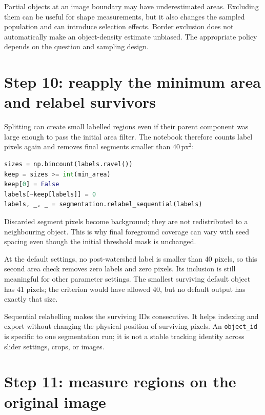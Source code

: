 \documentclass[11pt,letterpaper]{article}
\newcommand{\field}[1]{\nolinkurl{#1}}
\newcommand{\pxsq}{\ensuremath{\mathrm{px}^{2}}}
\begin{document}
Partial objects at an image boundary may have underestimated areas. Excluding them can be useful for shape measurements, but it also changes the sampled population and can introduce selection effects. Border exclusion does not automatically make an object-density estimate unbiased. The appropriate policy depends on the question and sampling design.

\section{Step 10: reapply the minimum area and relabel survivors}
\label{sec:postfilter}

Splitting can create small labelled regions even if their parent component was large enough to pass the initial area filter. The notebook therefore counts label pixels again and removes final segments smaller than 40\,\pxsq:
\begin{lstlisting}[language=Python]
sizes = np.bincount(labels.ravel())
keep = sizes >= int(min_area)
keep[0] = False
labels[~keep[labels]] = 0
labels, _, _ = segmentation.relabel_sequential(labels)
\end{lstlisting}
Discarded segment pixels become background; they are not redistributed to a neighbouring object. This is why final foreground coverage can vary with seed spacing even though the initial threshold mask is unchanged.

At the default settings, no post-watershed label is smaller than 40 pixels, so this second area check removes zero labels and zero pixels. Its inclusion is still meaningful for other parameter settings. The smallest surviving default object has 41 pixels; the criterion would have allowed 40, but no default output has exactly that size.

Sequential relabelling makes the surviving IDs consecutive. It helps indexing and export without changing the physical position of surviving pixels. An \field{object_id} is specific to one segmentation run; it is not a stable tracking identity across slider settings, crops, or images.

\section{Step 11: measure regions on the original image}
\label{sec:measurements}
\end{document}
